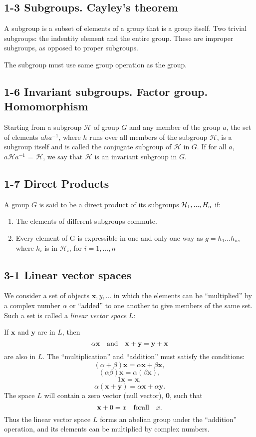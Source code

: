 
\subsection{1-3 Subgroups. Cayley's theorem}

A subgroup is a subset of elements of a group that is a group itself. Two trivial subgroups: the indentity element and the entire group. These are improper subgroups, as opposed to proper subgroups.

The subgroup must use same group operation as the group.

\subsection{1-6 Invariant subgroups. Factor group. Homomorphism}

Starting from a subgroup $\mathcal H$ of group $G$ and any member of the group $a$, the set of elements $aha^{-1}$, where $h$ runs over all members of the subgroup $\mathcal H$, is a subgroup itself and is called the conjugate subgroup of $\mathcal H$ in $G$. If for all $a$, $a{\mathcal H} a^{-1}$ =  $\mathcal H$, we say that $\mathcal H$ is an invariant subgroup in $G$.

\subsection{1-7 Direct Products}

A group $G$ is said to be a direct product of its subgroups ${\mathcal H_{\rm 1},...,H_{\rm n}}$ if:

\begin{enumerate}
\item The elements of different subgroups commute.
\item Every element of G is expressible in one and only one way as $g = h_1...h_n$, where $h_i$ is in ${\mathcal H}_i$, for $i = 1,...,n$
\end{enumerate}

\subsection{3-1 Linear vector spaces}

\def\bx{\mathbf x}
\def\by{\mathbf y}

We consider a set of objects $\mathbf x,y,...$ in which the elements can be ``multiplied'' by a complex number $\alpha$ or ``added'' to one another to give members of the same set. Such a set is called a {\it linear vector space} $L$:

If $\bx$ and $\by$ are in $L$, then
$$
\alpha{\mathbf x} \quad {\rm and} \quad {\bx+\by = \by+\bx}
$$
are also in $L$. The ``multiplication'' and ``addition'' must satisfy the conditions:
$$(\alpha + \beta)\bx = \alpha\bx + \beta\bx,$$
$$(\alpha\beta)\bx = \alpha(\beta\bx),$$
$$1\bx = \bx,$$
$$\alpha(\bx+\by) = \alpha\bx + \alpha\by.$$
The space $L$ will contain a zero vector (null vector), {\bf 0}, such that
$$\mathbf x + 0 = x \quad {\rm for all} \quad x.$$
Thus the linear vector space $L$ forms an abelian group under the ``addition'' operation, and its elements can be multiplied by complex numbers.

